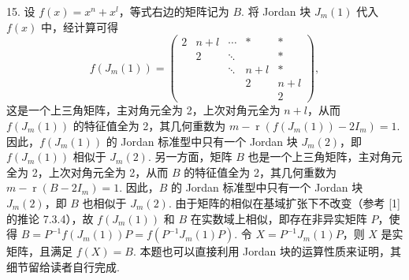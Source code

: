 \documentclass[UTF8,12pt,a4paper,fontset=fandol]{ctexart}
\begin{document}
15. 设 $f(x)=x^n+x^l$，等式右边的矩阵记为 $B$. 将 Jordan 块 $J_m(1)$ 代入 $f(x)$ 中，经计算可得
\[
f(J_m(1))=\left(\begin{array}{ccccc}
2&n+l&\cdots&*&*\\
&2&\ddots&&*\\
&&\ddots&n+l&*\\
&&&2&n+l\\
&&&&2
\end{array}\right),
\]
这是一个上三角矩阵，主对角元全为 2，上次对角元全为 $n+l$，从而 $f(J_m(1))$ 的特征值全为 2，其几何重数为 $m-\operatorname{r}(f(J_m(1))-2I_m)=1$. 因此，$f(J_m(1))$ 的 Jordan 标准型中只有一个 Jordan 块 $J_m(2)$，即 $f(J_m(1))$ 相似于 $J_m(2)$. 另一方面，矩阵 $B$ 也是一个上三角矩阵，主对角元全为 2，上次对角元全为 2，从而 $B$ 的特征值全为 2，其几何重数为 $m-\operatorname{r}(B-2I_m)=1$. 因此，$B$ 的 Jordan 标准型中只有一个 Jordan 块 $J_m(2)$，即 $B$ 也相似于 $J_m(2)$. 由于矩阵的相似在基域扩张下不改变（参考 [1] 的推论 7.3.4），故 $f(J_m(1))$ 和 $B$ 在实数域上相似，即存在非异实矩阵 $P$，使得 $B=P^{-1}f(J_m(1))P=f(P^{-1}J_m(1)P)$. 令 $X=P^{-1}J_m(1)P$，则 $X$ 是实矩阵，且满足 $f(X)=B$. 本题也可以直接利用 Jordan 块的运算性质来证明，其细节留给读者自行完成.
\end{document}
